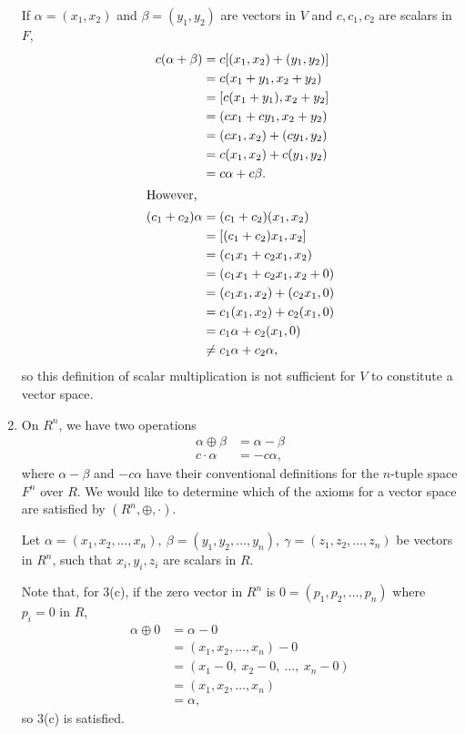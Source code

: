 \documentclass[12pt]{article}
\begin{document}
\begin{enumerate}
    If $\alpha = (x_1,x_2)$ and $\beta = (y_1,y_2)$ are vectors in $V$ and
    $c,c_1,c_2$ are scalars in $F$,
    \begin{align*}
      c(\alpha + \beta) &= c[(x_1,x_2) + (y_1,y_2)]\\
                        &= c(x_1 + y_1,x_2 + y_2)\\
                        &= [c(x_1 + y_1),x_2 + y_2]\\
                        &= (cx_1 + cy_1,x_2 + y_2)\\
                        &= (cx_1,x_2) + (cy_1,y_2)\\
                        &= c(x_1,x_2) + c(y_1,y_2)\\
                        &= c\alpha + c\beta.\\
      \shortintertext{However,}
      (c_1 + c_2)\alpha &= (c_1 + c_2)(x_1,x_2)\\
                        &= [(c_1 + c_2)x_1,x_2]\\
                        &= (c_1x_1 + c_2x_1,x_2)\\
                        &= (c_1x_1 + c_2x_1,x_2 + 0)\\
                        &= (c_1x_1,x_2) + (c_2x_1,0)\\
                        &= c_1(x_1,x_2) + c_2(x_1,0)\\
                        &= c_1\alpha + c_2(x_1,0)\\
                        &\neq c_1\alpha + c_2\alpha,
    \end{align*}
    so this definition of scalar multiplication is not sufficient for $V$ to
    constitute a vector space.

  \item
    On $R^{n}$, we have two operations
    \begin{align*}
      \alpha \oplus \beta &= \alpha - \beta\\
      c \cdot \alpha &= -c\alpha,
    \end{align*}
    where $\alpha - \beta$ and $-c\alpha$ have their conventional definitions for the
    $n$-tuple space $F^{n}$ over $R$. We would like to determine which of the axioms
    for a vector space are satisfied by $(R^{n},\oplus,\cdot)$.

    Let $\alpha = (x_1,x_2,\ldots,x_n),\ \beta = (y_1,y_2,\ldots,y_n),\ \gamma =
    (z_1,z_2,\ldots,z_n)$ be vectors in $R^{n}$, such that $x_i,y_i,z_i$ are scalars
    in $R$.

    Note that, for 3(c), if the zero vector in $R^{n}$ is $0 = (p_1,p_2,\ldots,p_n)$
    where $p_i = 0$ in $R$,
    \begin{align*}
      \alpha \oplus 0 &= \alpha - 0\\
                      &= (x_1,x_2,\ldots,x_n) - 0\\
                      &= (x_1-0,\ x_2-0,\ \ldots,\ x_n-0)\\
                      &= (x_1,x_2,\ldots,x_n)\\
                      &= \alpha,
    \end{align*}
    so 3(c) is satisfied.


\end{enumerate}
\end{document}
